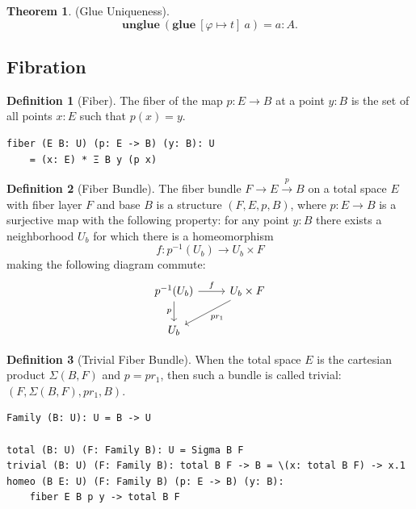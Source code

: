 \documentclass{article}
\theoremstyle{definition}
\newtheorem{definition}{Definition}
\newtheorem{theorem}{Theorem}
\begin{document}
\begin{theorem} (Glue Uniqueness).
$$
  \mathbf{unglue}\ (\mathbf{glue}\ [\varphi \mapsto t]\ a) = a : A.
$$
\end{theorem}

\newpage
\subsection{Fibration}

\begin{definition}[Fiber]
The fiber of the map \( p: E \rightarrow B \) at a point \( y: B \)
is the set of all points \( x: E \) such that \( p(x) = y \).

\begin{lstlisting}[mathescape=true]
fiber (E B: U) (p: E -> B) (y: B): U
    = (x: E) * Ξ B y (p x)
\end{lstlisting}
\end{definition}

\begin{definition}[Fiber Bundle]
The fiber bundle \( F \rightarrow E \xrightarrow{p} B \) on a
total space \( E \) with fiber layer \( F \) and base \( B \) is a structure \( (F,E,p,B) \),
where \( p: E \rightarrow B \) is a surjective map with the following property:
for any point \( y: B \) there exists a neighborhood \( U_b \)
for which there is a homeomorphism
\[
f: p^{-1}(U_b) \rightarrow U_b \times F
\]
making the following diagram commute:
\[
\begin{tikzcd}
p^{-1}(U_b) \arrow[r, "f"] \arrow[d, "p"'] & U_b \times F \arrow[dl, "pr_1"] \\
U_b &
\end{tikzcd}
\]
\end{definition}

\begin{definition}[Trivial Fiber Bundle]
When the total space \( E \) is the cartesian product \( \Sigma(B,F) \)
and \( p = pr_1 \), then such a bundle is called trivial: \( (F,\Sigma(B,F),pr_1,B) \).

\begin{lstlisting}[mathescape=true]
Family (B: U): U = B -> U

total (B: U) (F: Family B): U = Sigma B F
trivial (B: U) (F: Family B): total B F -> B = \(x: total B F) -> x.1
homeo (B E: U) (F: Family B) (p: E -> B) (y: B):
    fiber E B p y -> total B F
\end{lstlisting}
\end{definition}
\end{document}

